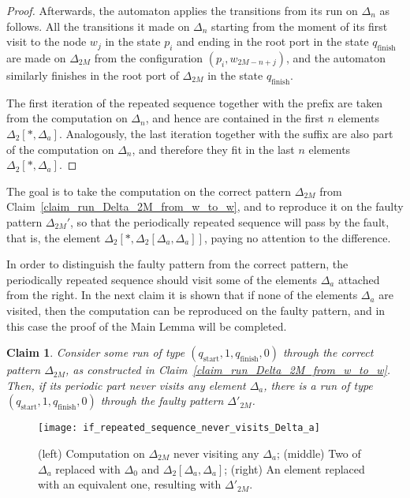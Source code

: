\documentclass[12pt,a4paper]{article}
\newtheorem{claim}{Claim}
\theoremstyle{definition}
\begin{document}
\begin{proof}
Afterwards, the automaton
applies the transitions from its run on $\Delta_n$ as follows.
All the transitions it made on $\Delta_n$ starting from the 
moment of its first visit to the node $w_j$ in the state $p_i$
and ending in the root port in the state $q_{\text{finish}}$
are made on $\Delta_{2M}$ from the configuration $(p_i,w_{2M-n+j})$,
and the automaton similarly finishes
in the root port of $\Delta_{2M}$ in the state $q_{\text{finish}}$.

The first iteration of the repeated sequence together with the prefix
are taken from the computation on $\Delta_n$,
and hence are contained in the first $n$ elements $\Delta_2[*, \Delta_a]$.
Analogously, the last iteration together with the suffix
are also part of the computation on $\Delta_n$,
and therefore they fit in the last $n$ elements $\Delta_2[*, \Delta_a]$.
\end{proof}

The goal is to take the computation on the correct pattern $\Delta_{2M}$
from Claim~\ref{claim_run_Delta_2M_from_w_to_w},
and to reproduce it on the faulty pattern $\Delta_{2M}'$,
so that the periodically repeated sequence will pass by the fault,
that is, the element $\Delta_2[*,\Delta_2[\Delta_a,\Delta_a]]$,
paying no attention to the difference.

In order to distinguish the faulty pattern from the correct pattern,
the periodically repeated sequence
should visit some of the elements $\Delta_a$ attached from the right.
In the next claim it is shown that if none of the elements $\Delta_a$ are visited,
then the computation can be reproduced on the faulty pattern,
and in this case the proof of the Main Lemma will be completed.

\begin{claim}\label{claim_run_Delta_2M_from_w_to_w_never_visiting_Delta_a}
Consider some run of type $(q_{\text{start}},1,q_{\text{finish}},0)$
through the correct pattern $\Delta_{2M}$,
as constructed in Claim~\ref{claim_run_Delta_2M_from_w_to_w}.
Then, if its periodic part never visits any element $\Delta_a$,
there is a run of type $(q_{\text{start}},1,q_{\text{finish}},0)$
through the faulty pattern $\Delta'_{2M}$.
\end{claim}

\begin{figure}[t]
	\centerline{\texttt{[image: if\_repeated\_sequence\_never\_visits\_Delta\_a]}}
	\caption{(left) Computation on $\Delta_{2M}$ never visiting any $\Delta_a$;
		(middle) Two of $\Delta_a$ replaced with $\Delta_0$ and $\Delta_2[\Delta_a, \Delta_a]$;
		(right) An element replaced with an equivalent one, resulting with $\Delta'_{2M}$.}
	\label{f:if_repeated_sequence_never_visits_Delta_a}
\end{figure}
\end{document}
